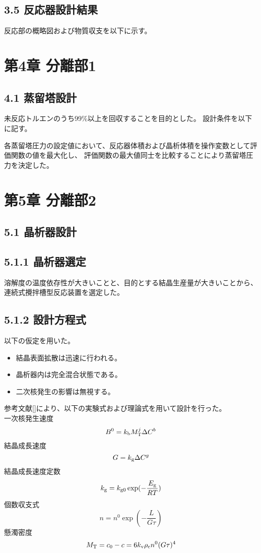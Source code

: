 \documentclass[a4j]{jsarticle}
\begin{document}
\subsection*{3.5 反応器設計結果} 
反応部の概略図および物質収支を以下に示す。

\newpage
\section*{第4章 分離部1}
\subsection*{4.1 蒸留塔設計}
未反応トルエンのうち99\%以上を回収することを目的とした。
設計条件を以下に記す。

各蒸留塔圧力の設定値において、反応器体積および晶析体積を操作変数として評価関数の値を最大化し、
評価関数の最大値同士を比較することにより蒸留塔圧力を決定した。

\newpage
\section*{第5章 分離部2}
\subsection*{5.1 晶析器設計}
\subsection*{5.1.1 晶析器選定}
溶解度の温度依存性が大きいことと、目的とする結晶生産量が大きいことから、
連続式攪拌槽型反応装置を選定した。
\subsection*{5.1.2 設計方程式}
以下の仮定を用いた。
\begin{itemize} 
    \item 結晶表面拡散は迅速に行われる。\\
    \item 晶析器内は完全混合状態である。\\
    \item 二次核発生の影響は無視する。
\end{itemize}

参考文献[]により、以下の実験式および理論式を用いて設計を行った。\\
一次核発生速度
\begin{equation}
    B^0 = k_{{\rm b}}M_{{\rm T}}^j \Delta C^b
\end{equation}
結晶成長速度
\begin{equation}
    G = k_{{\rm g}}\Delta C^g
\end{equation}
結晶成長速度定数
\begin{equation}
    k_{{\rm g}} = k_{{\rm g0}} \exp(-\frac{E_{{\rm g}}}{RT})
\end{equation}
個数収支式
\begin{equation}
    n=n^0 \exp(-\frac{L}{G\tau})
\end{equation}
懸濁密度
\begin{equation}
    M_{{\rm T}} = c_0-c = 6k_{{\rm v}}\rho_{{\rm c}}n^0(G\tau)^4
\end{equation}
\end{document}
